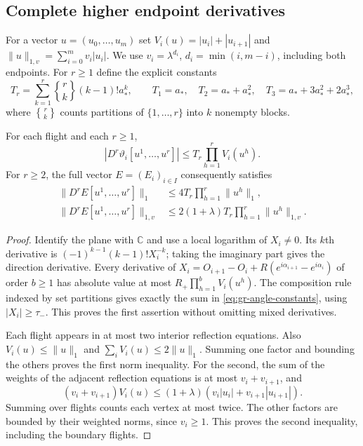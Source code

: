 \subsection{Complete higher endpoint derivatives}
For a vector $u=(u_0,\ldots,u_m)$ set
$V_i(u)=|u_i|+|u_{i+1}|$ and
$\|u\|_{1,v}=\sum_{i=0}^m v_i|u_i|$. We use
$v_i=\lambda^{d_i}$, $d_i=\min(i,m-i)$, including both endpoints.
For $r\ge1$ define the explicit constants
\begin{equation}\label{eq:gr-angle-constants}
 T_r=\sum_{k=1}^r {r\brace k}(k-1)!a_*^k,
 \qquad T_1=a_*,\quad T_2=a_*+a_*^2,
 \quad T_3=a_*+3a_*^2+2a_*^3,
\end{equation}
where ${r\brace k}$ counts partitions of $\{1,\ldots,r\}$ into $k$
nonempty blocks.

\begin{lemma}
\label{lem:gr-angle-tensors}
For each flight and each $r\ge1$,
\[
 |D^r\vartheta_i[u^1,\ldots,u^r]|
       \le T_r\prod_{h=1}^r V_i(u^h).
\]
For $r\ge2$, the full vector $E=(E_i)_{i\in I}$ consequently satisfies
\begin{align}
 \|D^rE[u^1,\ldots,u^r]\|_1
       &\le4T_r\prod_{h=1}^r\|u^h\|_1,\\
 \|D^rE[u^1,\ldots,u^r]\|_{1,v}
       &\le2(1+\lambda)T_r\prod_{h=1}^r\|u^h\|_{1,v}.
 \label{eq:gr-angle-norms}
\end{align}
\end{lemma}
\begin{proof}
Identify the plane with $\mathbb C$ and use a local logarithm of
$X_i\ne0$. Its $k$th derivative is
$(-1)^{k-1}(k-1)!X_i^{-k}$; taking the imaginary part gives the
direction derivative. Every derivative of
$X_i=O_{i+1}-O_i+R(e^{i\alpha_{i+1}}-e^{i\alpha_i})$
of order $b\ge1$ has absolute value at most
$R_+\prod_{h=1}^b V_i(u^h)$. The composition rule indexed by set
partitions gives exactly the sum in \eqref{eq:gr-angle-constants},
using $|X_i|\ge\tau_-$. This proves the first assertion without
omitting mixed derivatives.

Each flight appears in at most two interior reflection equations.
Also $V_i(u)\le\|u\|_1$ and $\sum_iV_i(u)\le2\|u\|_1$.
Summing one factor and bounding the others proves the first norm
inequality. For the second, the sum of the weights of the adjacent
reflection equations is at most $v_i+v_{i+1}$, and
\[
 (v_i+v_{i+1})V_i(u)
 \le(1+\lambda)(v_i|u_i|+v_{i+1}|u_{i+1}|).
\]
Summing over flights counts each vertex at most twice. The other
factors are bounded by their weighted norms, since $v_i\ge1$.
This proves the second inequality, including the boundary flights.
\end{proof}

